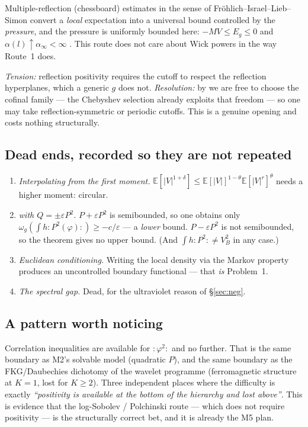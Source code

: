 \documentclass[11pt,a4paper]{article}
\theoremstyle{plain}
\theoremstyle{definition}
\begin{document}
Multiple-reflection (chessboard) estimates in the sense of Fr\"ohlich--Israel--Lieb--Simon convert a
\emph{local} expectation into a universal bound controlled by the \emph{pressure}, and the pressure
is uniformly bounded here: $-MV\le E_g\le0$ \cite[Thm.~5.1]{GJIII} and $\alpha(l)\uparrow\alpha_\infty<\infty$
\cite[Thm.~1]{GRS72}. This route does not care about Wick powers in the way Route~1 does.

\emph{Tension:} reflection positivity requires the cutoff to respect the reflection hyperplanes,
which a generic $g$ does not. \emph{Resolution:} by \cite[Thm.~3.3]{M1} we are free to choose the
cofinal family --- the Chebyshev selection already exploits that freedom --- so one may take
reflection-symmetric or periodic cutoffs. This is a genuine opening and costs nothing structurally.

\subsection*{Dead ends, recorded so they are not repeated}

\begin{enumerate}
\item \emph{Interpolating from the first moment.} $\mathbb E[|V|^{1+\delta}]\le
      \mathbb E[|V|]^{1-\theta}\mathbb E[|V|^{r}]^{\theta}$ needs a higher moment: circular.
\item \emph{\cite[Thm.~2]{GRS72} with $Q=\pm\varepsilon P^2$.} $P+\varepsilon P^2$ is semibounded, so one
      obtains only $\omega_g(\int h{:}P^2(\varphi){:})\ge-c/\varepsilon$ --- a \emph{lower} bound.
      $P-\varepsilon P^2$ is not semibounded, so the theorem gives no upper bound. (And
      $\int h{:}P^2{:}\ne V_B^2$ in any case.)
\item \emph{Euclidean conditioning.} Writing the local density via the Markov property produces an
      uncontrolled boundary functional --- that \emph{is} Problem~1.
\item \emph{The spectral gap.} Dead, for the ultraviolet reason of \S\ref{sec:neg}.
\end{enumerate}

\subsection*{A pattern worth noticing}

Correlation inequalities are available for ${:}\varphi^2{:}$ and no further. That is the same
boundary as M2's solvable model (quadratic $P$), and the same boundary as the FKG/Daubechies
dichotomy of the wavelet programme (ferromagnetic structure at $K=1$, lost for $K\ge2$). Three
independent places where the difficulty is exactly \emph{``positivity is available at the bottom of
the hierarchy and lost above''}. This is evidence that the log-Sobolev / Polchinski route --- which
does not require positivity --- is the structurally correct bet, and it is already the M5 plan.
\end{document}
